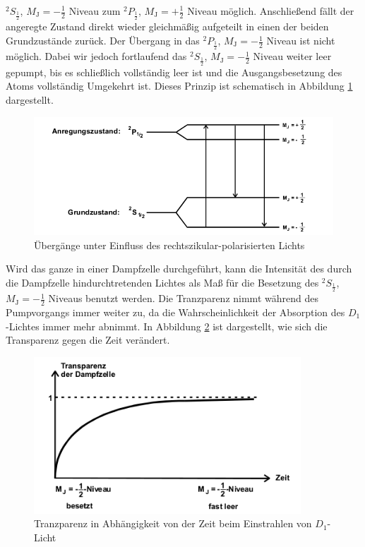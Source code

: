 $^2S_\frac{1}{2}$, $M_\text{J}=-\frac{1}{2}$ Niveau zum $^2P_\frac{1}{2}$, $M_\text{J}=+\frac{1}{2}$ Niveau möglich. Anschließend fällt der angeregte Zustand direkt wieder gleichmäßig aufgeteilt in einen der
beiden Grundzustände zurück. Der Übergang in das $^2P_\frac{1}{2}$, $M_\text{J}=-\frac{1}{2}$ Niveau ist nicht möglich.
Dabei wir jedoch fortlaufend das $^2S_\frac{1}{2}$, $M_\text{J}=-\frac{1}{2}$ Niveau weiter leer gepumpt, bis es schließlich vollständig leer ist und die Ausgangsbesetzung des Atoms vollständig Umgekehrt ist.
Dieses Prinzip ist schematisch in Abbildung \ref{abb:abb4} dargestellt.
\begin{figure}[H]
	\centering
	\includegraphics[width=12cm]{abb4.jpg}
	\caption{Übergänge unter Einfluss des rechtszikular-polarisierten Lichts \cite{V21}}
	\label{abb:abb4}
\end{figure}
Wird das ganze in einer Dampfzelle durchgeführt, kann die Intensität des durch die Dampfzelle hindurchtretenden Lichtes als Maß für die Besetzung des $^2S_\frac{1}{2}$, $M_\text{J}=-\frac{1}{2}$ Niveaus
benutzt werden. Die Tranzparenz nimmt während des Pumpvorgangs immer weiter zu, da die Wahrscheinlichkeit der Absorption des $D_1$-Lichtes immer mehr abnimmt. In Abbildung \ref{abb:abb5} ist dargestellt,
wie sich die Transparenz gegen die Zeit verändert.
\begin{figure}[H]
	\centering
	\includegraphics[width=10cm]{abb5.jpg}
	\caption{Tranzparenz in Abhängigkeit von der Zeit beim Einstrahlen von $D_1$-Licht \cite{V21}}
	\label{abb:abb5}
\end{figure}

